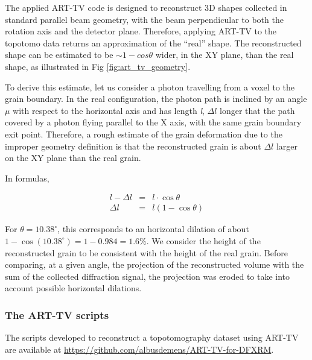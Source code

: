 \documentclass[11pt]{scrartcl}
\begin{document}
The applied {\footnotesize{ART-TV}} code is designed to reconstruct {\footnotesize{3D}} shapes collected in standard parallel beam geometry, with the beam perpendicular to both the rotation axis and the detector plane. Therefore, applying {\footnotesize{ART-TV}} to the topotomo data returns an approximation of the ``real'' shape. The reconstructed shape can be estimated to be $\sim 1 - cos\theta$ wider, in the {\footnotesize{XY}} plane, than the real shape, as illustrated in Fig \ref{fig:art_tv_geometry}.

To derive this estimate, let us consider a photon travelling from a voxel to the grain boundary. In the real configuration, the photon path is inclined by an angle $\mu$ with respect to the horizontal axis and has length {\emph{l}}, $\Delta l$ longer that the path covered by a photon flying parallel to the {\footnotesize{X}} axis, with the same grain boundary exit point. Therefore, a rough estimate of the grain deformation due to the improper geometry definition is that the reconstructed grain is about $\Delta l$ larger on the {\footnotesize{XY}} plane than the real grain.

In formulas,

\begin{eqnarray}
    l - \Delta l & = & l\cdot\cos\theta \\
    \Delta l & = & l (1 - \cos\theta)
\end{eqnarray}

For $\theta = 10.38^{\circ}$, this corresponds to an horizontal dilation of about $ 1 - \cos(10.38^{\circ}) = 1 - 0.984 = 1.6 \%$. We consider the height of the reconstructed grain to be consistent with the height of the real grain. Before comparing, at a given angle, the projection of the reconstructed volume with the sum of the collected diffraction signal, the projection was eroded to take into account possible horizontal dilations.

\subsubsection{The ART-TV scripts}

The scripts developed to reconstruct a topotomography dataset using {\footnotesize{ART-TV}} are available at \url{https://github.com/albusdemens/ART-TV-for-DFXRM}.
\end{document}
